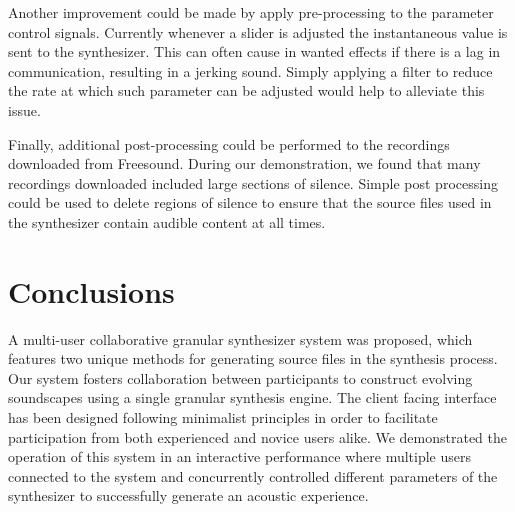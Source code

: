 \documentclass{nime-alternate}
\begin{document}
Another improvement could be made by apply pre-processing to the parameter control signals. 
Currently whenever a slider is adjusted the instantaneous value is sent to the synthesizer. 
This can often cause in wanted effects if there is a lag in communication, resulting in a jerking sound.
Simply applying a filter to reduce the rate at which such parameter can be adjusted would help to 
alleviate this issue. 

Finally, additional post-processing could be performed to the recordings downloaded from Freesound.
During our demonstration, we found that many recordings downloaded included large sections of silence.
Simple post processing could be used to delete regions of silence to ensure that the source files
used in the synthesizer contain audible content at all times. 

\section{Conclusions}

A multi-user collaborative granular synthesizer system was proposed, which features two 
unique methods for generating source files in the synthesis process. 
Our system fosters collaboration between participants to construct evolving soundscapes
using a single granular synthesis engine. 
The client facing interface has been designed following minimalist principles in order to
facilitate participation from both experienced and novice users alike.  
We demonstrated the operation of this system in an interactive performance where multiple
users connected to the system and concurrently controlled different parameters of the synthesizer
to successfully generate an acoustic experience.



%
%
\end{document}
